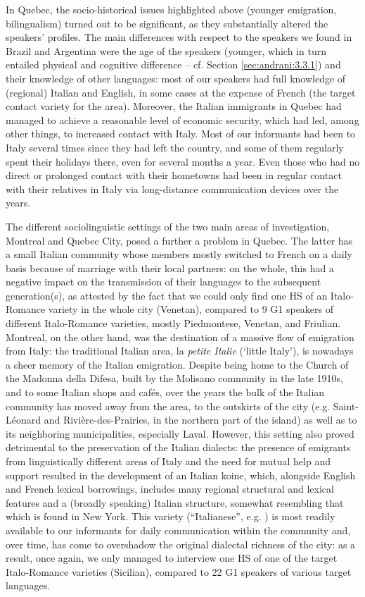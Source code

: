 \documentclass[output=paper,hidelinks]{langscibook}
\begin{document}
In Quebec, the socio-historical issues highlighted above (younger emigration, bilingualism) turned out to be significant, as they substantially altered the speakers’ profiles. The main differences with respect to the speakers we found in Brazil and Argentina were the age of the speakers (younger, which in turn entailed physical and cognitive difference – cf. Section \ref{sec:andrani:3.3.1}) and their knowledge of other languages: most of our speakers had full knowledge of (regional) Italian and English, in some cases at the expense of French (the target contact variety for the area). Moreover, the Italian immigrants in Quebec had managed to achieve a reasonable level of economic security, which had led, among other things, to increased contact with Italy. Most of our informants had been to Italy several times since they had left the country, and some of them regularly spent their holidays there, even for several months a year. Even those who had no direct or prolonged contact with their hometowns had been in regular contact with their relatives in Italy via long-distance communication devices over the years.

The different sociolinguistic settings of the two main areas of investigation, Montreal and Quebec City, posed a further a problem in Quebec. The latter has a small Italian community whose members mostly switched to French on a daily basis because of marriage with their local partners: on the whole, this had a negative impact on the transmission of their languages to the subsequent generation(s), as attested by the fact that we could only find one HS of an Italo-Romance variety in the whole city (Venetan), compared to 9 G1 speakers of different Italo-Romance varieties, mostly Piedmontese, Venetan, and Friulian. Montreal, on the other hand, was the destination of a massive flow of emigration from Italy: the traditional Italian area, la \textit{petite Italie} (‘little Italy’), is nowadays a sheer memory of the Italian emigration. Despite being home to the Church of the Madonna della Difesa, built by the Molisano community in the late 1910s, and to some Italian shops and cafés, over the years the bulk of the Italian community has moved away from the area, to the outskirts of the city (e.g. Saint-Léonard and Rivière-des-Prairies, in the northern part of the island) as well as to its neighboring municipalities, especially Laval. However, this setting also proved detrimental to the preservation of the Italian dialects: the presence of emigrants from linguistically different areas of Italy and the need for mutual help and support resulted in the development of an Italian koine, which, alongside English and French lexical borrowings, includes many regional structural and lexical features and a (broadly speaking) Italian structure, somewhat resembling that which is found in New York. This variety (``Italianese'', e.g. \citealt{Villata2010}) is most readily available to our informants for daily communication within the community and, over time, has come to overshadow the original dialectal richness of the city: as a result, once again, we only managed to interview one HS of one of the target Italo-Romance varieties (Sicilian), compared to 22 G1 speakers of various target languages. 
\end{document}
